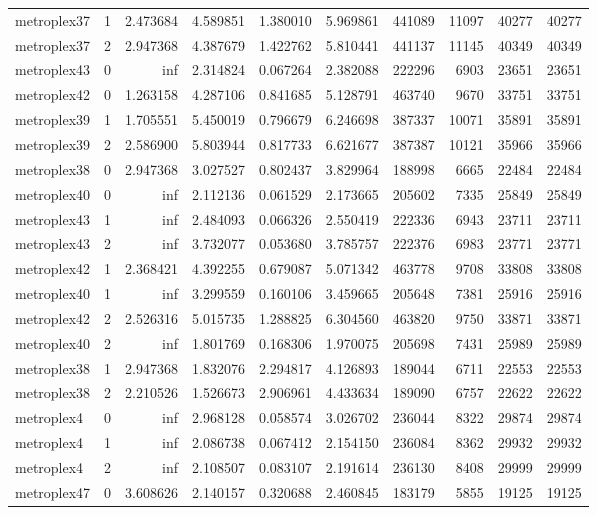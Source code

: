 \begin{longtable}{|l|r|r|r|r|r|r|r|r|r|}
metroplex37 & 1 & 2.473684 & 4.589851 & 1.380010 & 5.969861 & 441089 & 11097 & 40277 & 40277 \\
metroplex37 & 2 & 2.947368 & 4.387679 & 1.422762 & 5.810441 & 441137 & 11145 & 40349 & 40349 \\
metroplex43 & 0 & inf & 2.314824 & 0.067264 & 2.382088 & 222296 & 6903 & 23651 & 23651 \\
metroplex42 & 0 & 1.263158 & 4.287106 & 0.841685 & 5.128791 & 463740 & 9670 & 33751 & 33751 \\
metroplex39 & 1 & 1.705551 & 5.450019 & 0.796679 & 6.246698 & 387337 & 10071 & 35891 & 35891 \\
metroplex39 & 2 & 2.586900 & 5.803944 & 0.817733 & 6.621677 & 387387 & 10121 & 35966 & 35966 \\
metroplex38 & 0 & 2.947368 & 3.027527 & 0.802437 & 3.829964 & 188998 & 6665 & 22484 & 22484 \\
metroplex40 & 0 & inf & 2.112136 & 0.061529 & 2.173665 & 205602 & 7335 & 25849 & 25849 \\
metroplex43 & 1 & inf & 2.484093 & 0.066326 & 2.550419 & 222336 & 6943 & 23711 & 23711 \\
metroplex43 & 2 & inf & 3.732077 & 0.053680 & 3.785757 & 222376 & 6983 & 23771 & 23771 \\
metroplex42 & 1 & 2.368421 & 4.392255 & 0.679087 & 5.071342 & 463778 & 9708 & 33808 & 33808 \\
metroplex40 & 1 & inf & 3.299559 & 0.160106 & 3.459665 & 205648 & 7381 & 25916 & 25916 \\
metroplex42 & 2 & 2.526316 & 5.015735 & 1.288825 & 6.304560 & 463820 & 9750 & 33871 & 33871 \\
metroplex40 & 2 & inf & 1.801769 & 0.168306 & 1.970075 & 205698 & 7431 & 25989 & 25989 \\
metroplex38 & 1 & 2.947368 & 1.832076 & 2.294817 & 4.126893 & 189044 & 6711 & 22553 & 22553 \\
metroplex38 & 2 & 2.210526 & 1.526673 & 2.906961 & 4.433634 & 189090 & 6757 & 22622 & 22622 \\
metroplex4 & 0 & inf & 2.968128 & 0.058574 & 3.026702 & 236044 & 8322 & 29874 & 29874 \\
metroplex4 & 1 & inf & 2.086738 & 0.067412 & 2.154150 & 236084 & 8362 & 29932 & 29932 \\
metroplex4 & 2 & inf & 2.108507 & 0.083107 & 2.191614 & 236130 & 8408 & 29999 & 29999 \\
metroplex47 & 0 & 3.608626 & 2.140157 & 0.320688 & 2.460845 & 183179 & 5855 & 19125 & 19125 \\

\end{longtable}
